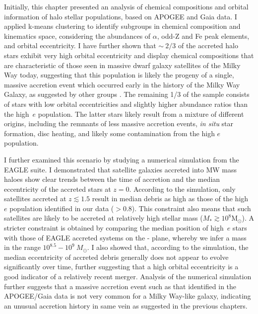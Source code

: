 Initially, this chapter presented an analysis of chemical compositions and orbital
information of halo stellar populations, based on APOGEE
and Gaia data. I applied k-means clustering to identify subgroups
in chemical composition and kinematics space, considering the
abundances of $\alpha$, odd-Z and Fe peak elements, and orbital
eccentricity.  I have further shown that $\sim~2/3$ of the accreted halo
stars exhibit very high orbital eccentricity and display chemical
compositions that are characteristic of those seen in massive dwarf
galaxy satellites of the Milky Way today, suggesting that this
population is likely the progeny of a single, massive accretion
event which occurred early in the history of the Milky Way Galaxy, as suggested by other groups
\citep[e.g.][]{2018MNRAS.475.1537M,2018arXiv180510288D,2018arXiv180606038H,2018MNRAS.478..611B}.
The remaining 1/3 of the sample consists of stars with low orbital
eccentricities and slightly higher abundance ratios than the high~$e$
population.  The latter stars likely result from a mixture of
different origins, including the remnants of less massive accretion
events, {\it in situ} star formation, disc heating, and likely some
contamination from the high $e$ population.

I further examined this scenario by studying a numerical simulation
from the EAGLE suite. I demonstrated that satellite galaxies accreted
into MW mass haloes show clear trends between the time of accretion
and the median eccentricity of the accreted stars at $z=0$.
According to the simulation, only satellites accreted at $z\lesssim
1.5$ result in median debris as high as those of the high~$e$
population identified in our data ($>0.8$). This constraint also
means that such satellites are likely to be accreted at  relatively
high stellar mass ($M_*\gtrsim 10^{8} \mathrm{M_{\odot}}$). 
A stricter constraint is obtained by comparing the median position
of high~$e$ stars with those of EAGLE accreted systems on the \mgfe{}-\feh{}
plane, whereby we infer a mass in the range $10^{8.5}-10^9~M_\odot$.
I also showed that, according to the simulation, the median
eccentricity of accreted debris generally does not appear to evolve
significantly over time, further suggesting that a high orbital
eccentricity is a good indicator of a relatively recent merger.
Analysis of the numerical simulation further suggests that a massive
accretion event such as that identified in the APOGEE/Gaia data is
not very common for a Milky Way-like galaxy, indicating an unusual
accretion history in same vein as suggested in the previous
chapters.

